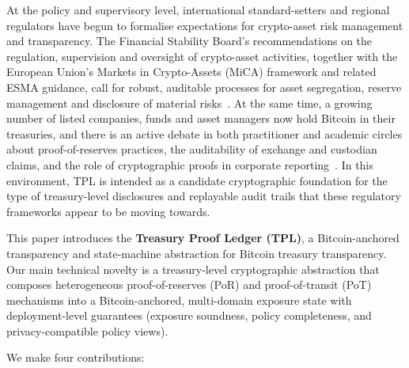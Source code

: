 \documentclass[11pt]{article}
\begin{document}
At the policy and supervisory level, international standard-setters and regional regulators have begun to formalise expectations for crypto-asset risk management and transparency. The Financial Stability Board's recommendations on the regulation, supervision and oversight of crypto-asset activities, together with the European Union's Markets in Crypto-Assets (MiCA) framework and related ESMA guidance, call for robust, auditable processes for asset segregation, reserve management and disclosure of material risks~\cite{FSB2023CryptoAssets,ESMA2023MiCA}. At the same time, a growing number of listed companies, funds and asset managers now hold Bitcoin in their treasuries, and there is an active debate in both practitioner and academic circles about proof-of-reserves practices, the auditability of exchange and custodian claims, and the role of cryptographic proofs in corporate reporting~\cite{Fidelity2023BitcoinTreasury,Dagher2015,Lazirko2025,VidalTomas2024}. In this environment, TPL is intended as a candidate cryptographic foundation for the type of treasury-level disclosures and replayable audit trails that these regulatory frameworks appear to be moving towards.

This paper introduces the \textbf{Treasury Proof Ledger (TPL)}, a Bitcoin-anchored transparency and state-machine abstraction for Bitcoin treasury transparency.
Our main technical novelty is a treasury-level cryptographic abstraction that composes heterogeneous proof-of-reserves (PoR) and proof-of-transit (PoT) mechanisms into a Bitcoin-anchored, multi-domain exposure state with deployment-level guarantees (exposure soundness, policy completeness, and privacy-compatible policy views).

We make four contributions:
\end{document}
